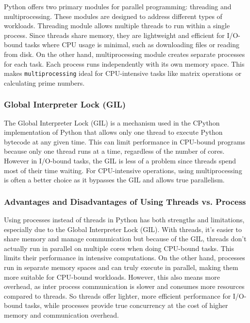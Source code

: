 \documentclass[onecolumn]{article}
\begin{document}
Python offers two primary modules for parallel programming: threading and multiprocessing. These modules are designed to address different types of workloads. Threading module allows multiple threads to run within a single process. Since threads share memory, they are lightweight and efficient for I/O-bound tasks where CPU usage is minimal, such as downloading files or reading from disk. On the other hand, multiprocessing module creates separate processes for each task. Each process runs independently with its own memory space. This makes \verb|multiprocessing| ideal for CPU-intensive tasks like matrix operations or calculating prime numbers. 

\subsubsection{Global Interpreter Lock (GIL)}

The Global Interpreter Lock (GIL) is a mechanism used in the CPython implementation of Python that allows only one thread to execute Python bytecode at any given time. This can limit performance in CPU-bound programs because only one thread runs at a time, regardless of the number of cores. However in I/O-bound tasks, the GIL is less of a problem since threads spend most of their time waiting. For CPU-intensive operations, using multiprocessing is often a better choice as it bypasses the GIL and allows true parallelism.

\subsubsection{Advantages and Disadvantages of Using Threads vs. Process}

Using processes instead of threads in Python has both strengths and limitations, especially due to the Global Interpreter Lock (GIL). With threads, it's easier to share memory and manage communication but because of the GIL, threads don't actually run in parallel on multiple cores when doing CPU-bound tasks. This limits their performance in intensive computations. On the other hand, processes run in separate memory spaces and can truly execute in parallel, making them more suitable for CPU-bound workloads. However, this also means more overhead, as inter process communication is slower and consumes more resources compared to threads. So threads offer lighter, more efficient performance for I/O-bound tasks, while processes provide true concurrency at the cost of higher memory and communication overhead. 
\end{document}
